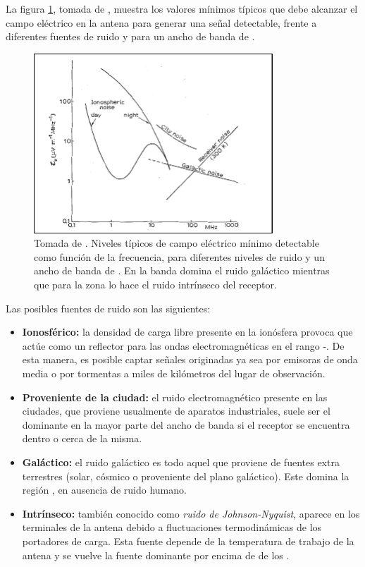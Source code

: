 	La figura \ref{fig:allanNoise}, tomada de \cite{allan1971}, muestra los valores m\'inimos t\'ipicos que debe alcanzar el campo el\'ectrico en la antena para generar una se\~nal detectable, frente a diferentes fuentes de ruido y para un ancho de banda de .
	\begin{figure}[ht!]
		\centering
		\includegraphics[width=0.8\textwidth]{./fig/simulacionRadio/allanNoise}
		\caption{\label{fig:allanNoise}
		Tomada de \cite{allan1971}. Niveles t\'ipicos de campo el\'ectrico m\'inimo detectable como funci\'on de la frecuencia, para diferentes niveles de ruido y un ancho de banda de .
		En la banda  domina el ruido gal\'actico mientras que para la zona  lo hace el ruido intr\'inseco del receptor.
		}
	\end{figure}
	Las posibles fuentes de ruido son las siguientes:
	\begin{itemize}
	 \item \textbf{Ionosf\'erico:} la densidad de carga libre presente en la ion\'osfera provoca que act\'ue como un reflector para las ondas electromagn\'eticas en el rango -. De esta manera, es posible captar se\~nales originadas ya sea por emisoras de onda media o por tormentas a miles de kil\'ometros del lugar de observaci\'on.
	 \item \textbf{Proveniente de la ciudad:} el ruido electromagn\'etico presente en las ciudades, que proviene usualmente de aparatos industriales, suele ser el dominante en la mayor parte del ancho de banda si el receptor se encuentra dentro o cerca de la misma.
	 \item \textbf{Gal\'actico:} el ruido gal\'actico es todo aquel que proviene de fuentes extra terrestres (solar, c\'osmico o proveniente del plano gal\'actico). Este domina la regi\'on , en ausencia de ruido humano.
	 \item \textbf{Intr\'inseco:} tambi\'en conocido como \emph{ruido de Johnson-Nyquist}, aparece en los terminales de la antena debido a fluctuaciones termodin\'amicas de los portadores de carga. Esta fuente depende de la temperatura de trabajo de la antena y se vuelve la fuente dominante por encima de de los .
	\end{itemize}
	
